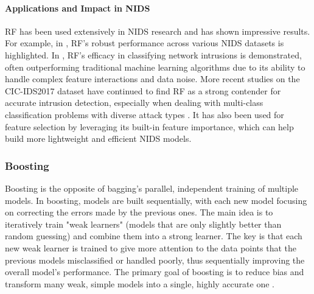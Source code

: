 \paragraph{Applications and Impact in NIDS} 
RF has been used extensively in NIDS research and has shown impressive results. For example, in \parencite{shafi2022comprehensive}, RF's robust performance across various NIDS datasets is highlighted. In \parencite{wang2023efficient}, RF's efficacy in classifying network intrusions is demonstrated, often outperforming traditional machine learning algorithms due to its ability to handle complex feature interactions and data noise. More recent studies on the CIC-IDS2017 dataset have continued to find RF as a strong contender for accurate intrusion detection, especially when dealing with multi-class classification problems with diverse attack types \parencite{almutairi2025intrusion}. It has also been used for feature selection by leveraging its built-in feature importance, which can help build more lightweight and efficient NIDS models.

\subsubsection{Boosting} 
Boosting is the opposite of bagging's parallel, independent training of multiple models. In boosting, models are built sequentially, with each new model focusing on correcting the errors made by the previous ones. The main idea is to iteratively train "weak learners" (models that are only slightly better than random guessing) and combine them into a strong learner. The key is that each new weak learner is trained to give more attention to the data points that the previous models misclassified or handled poorly, thus sequentially improving the overall model's performance. The primary goal of boosting is to reduce bias and transform many weak, simple models into a single, highly accurate one \parencite{friedman2001greedy}.

